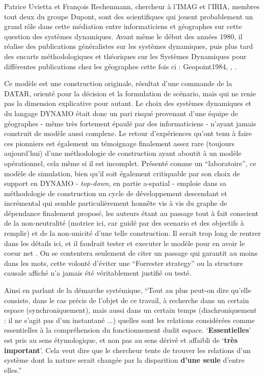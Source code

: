 Patrice Uvietta et François Rechenmann, chercheur à l'IMAG et l'IRIA, membres tout deux du groupe Dupont, sont des scientifiques qui jouent probablement un grand rôle dans cette médiation entre informaticiens et géographes sur cette question des systèmes dynamiques. Avant même le début des années 1980, il réalise des publications généralistes sur les systèmes dynamiques, puis plus tard des encarts méthodologiques et théoriques sur les Systèmes Dynamiques pour différentes publications chez les géographes cette fois ci : Geopoint1984, \autocite{CGR1983}, \autocite{Guermond1984}.

Ce modèle est une construction originale, résultat d'une commande de la DATAR, orienté pour la décision et la formulation de scénario, mais qui ne renie pas la dimension explicative pour autant. Le choix des systèmes dynamiques et du langage DYNAMO était donc un pari risqué provenant d'une équipe de géographes - même très fortement épaulé par des informaticiens - n'ayant jamais construit de modèle aussi complexe. Le retour d'expériences qu'ont tenu à faire ces pionniers est également un témoignage finalement assez rare (toujours aujourd'hui) d'une méthodologie de construction ayant aboutit à un modèle opérationnel, cela même si il est incomplet. Présenté comme un \enquote{laboratoire}, ce modèle de simulation, bien qu'il soit également critiquable par son choix de support en DYNAMO - \textit{top-down}, en partie a-spatial - emploie dans sa méthodologie de construction un cycle de développement descendant et incrémental qui semble particulièrement honnête vis à vis du graphe de dépendance finalement proposé, les auteurs étant au passage tout à fait conscient de la non-neutralité (motrice ici, car guidé par des scenario et des objectifs à remplir) et de la non-unicité d'une telle construction. Il serait trop long de rentrer dans les détails ici, et il faudrait tester et executer le modèle pour en avoir le coeur net . On se contentera seulement de citer un passage qui garantit au moins dans les mots, cette volonté d'éviter une \foreignquote{english}{Forrester strategy} \autocite[7-8]{Batty2001} ou la structure causale affiché n'a jamais été véritablement justifié ou testé.

Ainsi en parlant de la démarche systémique, \enquote{Tout au plus peut-on dire qu'elle consiste, dans le cas précis de l'objet de ce travail, à recherche dans un certain espace (synchroniquement), mais aussi dans un certain temps (diachroniquement : il ne s'agit pas d'un instantané ...) quelles sont les relations considérées comme essentielles à la compréhension du fonctionnement dudit espace. \enquote{\textbf{Essentielles}} est pris au sens étymologique, et non pas au sens dérivé et affaibli de \enquote{\textbf{très important}}. Cela veut dire que le chercheur tente de trouver les relations d'un système dont la nature serait changée par la disparition \textbf{d'une seule} d'entre elles.}

